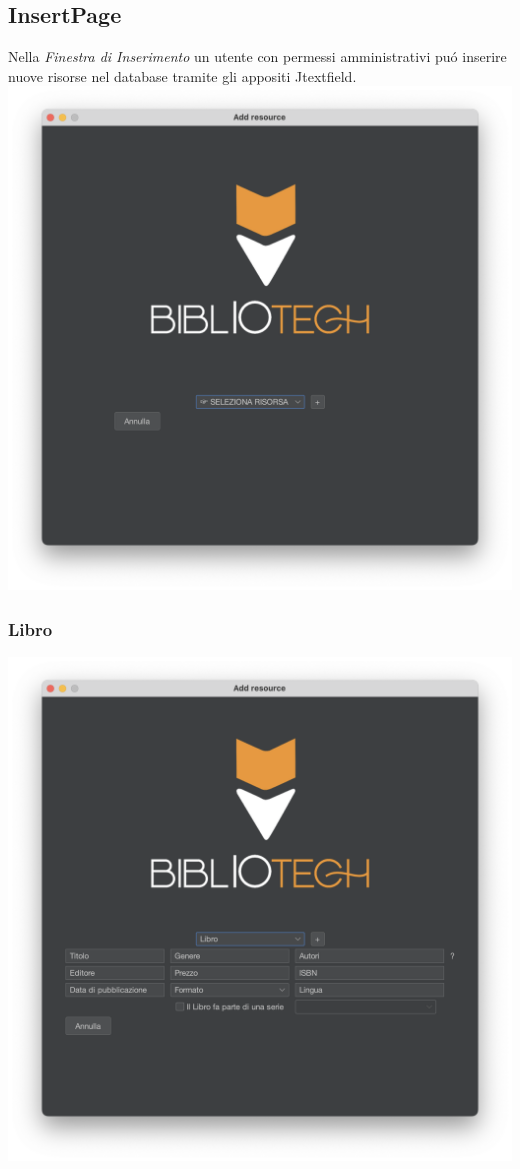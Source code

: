  \subsection{InsertPage}
 Nella \textit{Finestra di Inserimento} un utente con permessi amministrativi pu\'o inserire nuove risorse nel database tramite gli
 appositi Jtextfield.
 \\
 \includegraphics[scale=0.25, center]{Immagini/Schermate/Insert/InserisciRisorsaPage.png}

 \subsubsection{Libro}
 \includegraphics[scale=0.25, center]{Immagini/Schermate/Insert/InserisciRisorsaPage-Libro.png}
